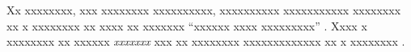 Xx xxxxxxxx, xxx xxxxxxxx xxxxxxxxxx, xxxxxxxxxx xxxxxxxxxxx xxxxxxxx xx x
  xxxxxxxx xx xxxx xx xxxxxxx \enquote{xxxxxx xxxx xxxxxxxxx}
  \cite{XxxxxXxXx:xxxx}.%
Xxxx x xxxxxxxx xx xxxxxx \emph{xxxxxxx} \cite{XxxxxXxXx:xxxx} xxx xx
  xxxxxxxx xxxxxxxxxxxxx xx x xxxxxxxx .
